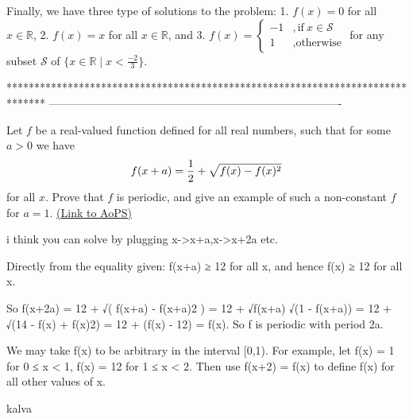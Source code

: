 \begin{solution}
Finally, we have three type of solutions to the problem: 
1. $f(x)=0$ for all $x\in \mathbb{R}$, 
2. $f(x)=x$ for all $x\in \mathbb{R}$, and 
3. $f(x)=\begin{cases} 
-1& , \text{if} \ x\in \mathcal{S}\\
1& , \text{otherwise}
\end{cases}$ for any subset $\mathcal{S}$ of $\{ x\in \mathbb{R}\mid x<\frac{-2}{3} \}$.
\end{solution}
*******************************************************************************
-------------------------------------------------------------------------------

\begin{problem}
	Let $f$ be a real-valued function defined for all real numbers, such that for some $a>0$ we have \[ f(x+a)={1\over2}+\sqrt{f(x)-f(x)^2} \] for all $x$.
Prove that $f$ is periodic, and give an example of such a non-constant $f$ for $a=1$.
	\flushright \href{https://artofproblemsolving.com/community/c6h59591}{(Link to AoPS)}
\end{problem}



\begin{solution}
	i think you can solve by plugging x->x+a,x->x+2a etc.
\end{solution}



\begin{solution}
	Directly from the equality given: f(x+a) ≥ 1\/2 for all x, and hence f(x) ≥ 1\/2 for all x. 

So f(x+2a) = 1\/2 + √( f(x+a) - f(x+a)2 ) = 1\/2 + √f(x+a) √(1 - f(x+a)) = 1\/2 + √(1\/4 - f(x) + f(x)2) = 1\/2 + (f(x) - 1\/2) = f(x). So f is periodic with period 2a. 

We may take f(x) to be arbitrary in the interval [0,1). For example, let f(x) = 1 for 0 ≤ x < 1, f(x) = 1\/2 for 1 ≤ x < 2. Then use f(x+2) = f(x) to define f(x) for all other values of x.

kalva
\end{solution}



